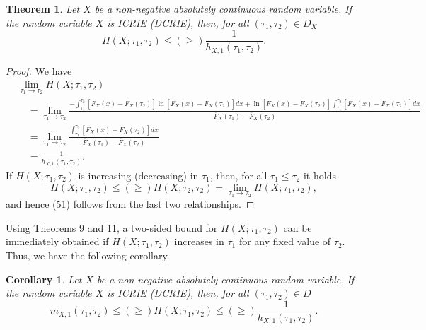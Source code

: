 \documentclass[11pt]{article}
\newtheorem{theorem}{Theorem}
\newtheorem{corollary}{Corollary}
\begin{document}
 
\begin{theorem}
	Let $X$ be a non-negative absolutely continuous random variable. If the random variable $X$ is ICRIE (DCRIE), then, for all $(\tau_1,\tau_2) \in D_X$
	\begin{equation}
		H(X; \tau_1, \tau_2) \leq (\geq) \frac{1}{h_{X,1}(\tau_1, \tau_2)}.
	\end{equation}
\end{theorem}

\begin{proof}
	We have
	\begin{align*}
			& \textstyle \lim_{\tau_1 \to \tau_2} H(X;\tau_1,\tau_2) \\
			& \quad \textstyle = \lim_{\tau_1 \to \tau_2} \frac{- \int_{\tau_1}^{\tau_2} [\overline{F}_X(x) - \overline{F}_X(\tau_2)] \ln[\overline{F}_X(x) - \overline{F}_X(\tau_2)] dx + \ln[\overline{F}_X(x) - \overline{F}_X(\tau_2)] \int_{\tau_1}^{\tau_2} [\overline{F}_X(x) - \overline{F}_X(\tau_2)] dx}{\overline{F}_X(\tau_1) - \overline{F}_X(\tau_2)} \\
			& \quad \textstyle = \lim_{\tau_1 \to \tau_2} \frac{\int_{\tau_1}^{\tau_2} [\overline{F}_X(x) - \overline{F}_X(\tau_2)] dx}{\overline{F}_X(\tau_1) - \overline{F}_X(\tau_2)} \\
			& \quad \textstyle = \frac{1}{h_{X,1}(\tau_1, \tau_2)}.
	\end{align*}
	If $H(X;\tau_1,\tau_2)$ is increasing (decreasing) in $\tau_1$, then, for all $\tau_1 \leq \tau_2$ it holds $$ \textstyle H(X;\tau_1,\tau_2) \leq (\geq) H(X;\tau_2,\tau_2) = \lim_{\tau_1 \to \tau_2} H(X;\tau_1,\tau_2), $$ and hence (51) follows from the last two relationships.
\end{proof}

Using Theorems 9 and 11, a two-sided bound for $H(X;\tau_1,\tau_2)$ can be immediately obtained if $H(X;\tau_1,\tau_2)$ increases in $\tau_1$ for any fixed value of $\tau_2$. Thus, we have the following corollary.

\begin{corollary}
	Let $X$ be a non-negative absolutely continuous random variable. If the random variable $X$ is ICRIE (DCRIE), then, for all $(\tau_1,\tau_2) \in D$
	$$ \textstyle m_{X,1}(\tau_1, \tau_2) \leq (\geq) H(X;\tau_1,\tau_2) \leq (\geq) \frac{1}{h_{X,1}(\tau_1, \tau_2)}. $$
\end{corollary}
\end{document}

